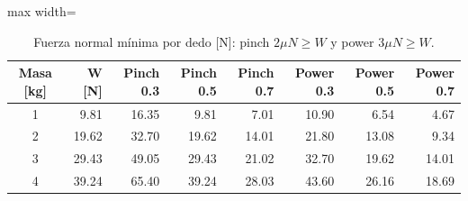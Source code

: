 \begin{table}[H]
\centering

\begin{adjustbox}{max width=\textwidth}
\begin{tabular}{|c|r|r|r|r|r|r|r|}
\hline
\textbf{Masa [kg]} & \textbf{W [N]} & \textbf{Pinch 0.3} & \textbf{Pinch 0.5} & \textbf{Pinch 0.7} & \textbf{Power 0.3} & \textbf{Power 0.5} & \textbf{Power 0.7} \\ \hline
1 & 9.81 & 16.35 & 9.81 & 7.01 & 10.90 & 6.54 & 4.67 \\ \hline
2 & 19.62 & 32.70 & 19.62 & 14.01 & 21.80 & 13.08 & 9.34 \\ \hline
3 & 29.43 & 49.05 & 29.43 & 21.02 & 32.70 & 19.62 & 14.01 \\ \hline
4 & 39.24 & 65.40 & 39.24 & 28.03 & 43.60 & 26.16 & 18.69 \\ \hline
\end{tabular}
\end{adjustbox}
\caption{Fuerza normal mínima por dedo [N]: pinch $2\mu N \geq W$ y power $3\mu N \geq W$.}
\label{tab:nmin}
\end{table}